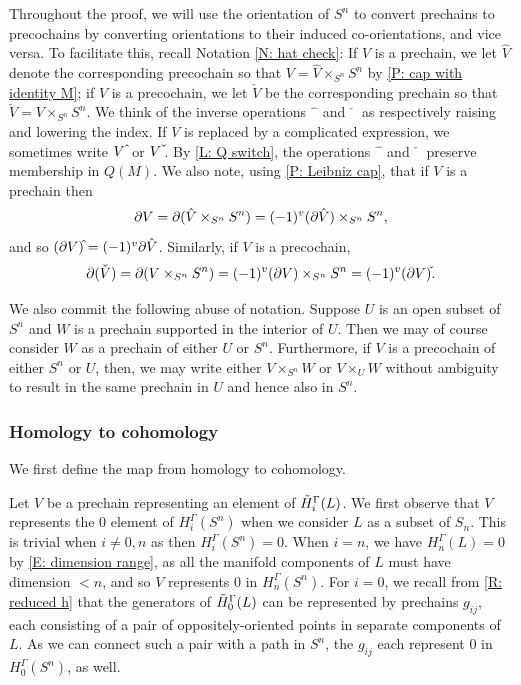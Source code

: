 Throughout the proof, we will use the orientation of $S^n$ to convert prechains to precochains by converting orientations to their induced co-orientations, and vice versa.
To facilitate this, recall Notation \ref{N: hat check}:
If $V$ is a prechain, we let $\hat V$ denote the corresponding precochain so that $V = \hat V \times_{S^n} S^n$ by \cref{P: cap with identity M}; if $V$ is a precochain, we let $\check V$ be the corresponding prechain so that $\check V = V \times_{S^n} S^n$.
We think of the inverse operations $\hat{\phantom{a}}$ and $\check{\phantom{a}}$ as respectively raising and lowering the index.
If $V$ is replaced by a complicated expression, we sometimes write $V\,\hat{\vrule height1.3ex width0pt}$ or $V\,\check{\vrule height1.3ex width0pt}$.
By \cref{L: Q switch}, the operations $\hat{\phantom{a}}$ and $\check{\phantom{a}}$ preserve membership in $Q(M)$.
We also note, using \cref{P: Leibniz cap}, that if $V$ is a prechain then
$$\partial V = \partial(\hat V \times_{S^n} S^n) = (-1)^{v} (\partial \hat V) \times_{S^n} S^n,$$
and so $(\bd V)\hat{\vrule height1.3ex width0pt} = (-1)^{v} \bd \hat V$.
Similarly, if $V$ is a precochain, $$\bd(\check V) = \bd(V \times_{S^n} S^n) = (-1)^{v} (\bd V) \times_{S^n} S^n = (-1)^v (\bd V)\check{\vrule height1.3ex width0pt}.$$

We also commit the following abuse of notation.
Suppose $U$ is an open subset of $S^n$ and $W$ is a prechain supported in the interior of $U$.
Then we may of course consider $W$ as a prechain of either $U$ or $S^n$.
Furthermore, if $V$ is a precochain of either $S^n$ or $U$, then, we may write either $V \times_{S^n} W$ or $V \times_U W$ without ambiguity to result in the same prechain in $U$ and hence also in $S^n$.


\subsubsection{Homology to cohomology} We first define the map from homology to cohomology.

Let $V$ be a prechain representing an element of $\tilde H_i^\Gamma(L)$.
We first observe that $V$ represents the $0$ element of $H_i^\Gamma(S^n)$ when we consider $L$ as a subset of $S_n$.
This is trivial when $i \neq 0,n$ as then $H_i^\Gamma(S^n)=0$.
When $i = n$, we have $H_n^\Gamma(L) = 0$ by \cref{E: dimension range}, as all the manifold components of $L$ must have dimension $<n$, and so $V$ represents $0$ in $H_n^\Gamma(S^n)$.
For $i=0$, we recall from \cref{R: reduced h} that the generators of $\tilde H_0^\Gamma(L)$ can be represented by prechains $g_{ij}$, each consisting of a pair of oppositely-oriented points in separate components of $L$.
As we can connect such a pair with a path in $S^n$, the $g_{ij}$ each represent $0$ in $H_0^\Gamma(S^n)$, as well.

